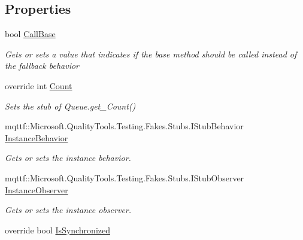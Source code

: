 \subsection*{Properties}
\begin{DoxyCompactItemize}
\item 
bool \hyperlink{class_system_1_1_collections_1_1_fakes_1_1_stub_queue_af8e85de8544d9c9900bdb8a3e651a3f9}{Call\-Base}
\begin{DoxyCompactList}\small\item\em Gets or sets a value that indicates if the base method should be called instead of the fallback behavior\end{DoxyCompactList}\item 
override int \hyperlink{class_system_1_1_collections_1_1_fakes_1_1_stub_queue_a956dfe53ab338c748c0e58170f743e9e}{Count}
\begin{DoxyCompactList}\small\item\em Sets the stub of Queue.\-get\-\_\-\-Count()\end{DoxyCompactList}\item 
mqttf\-::\-Microsoft.\-Quality\-Tools.\-Testing.\-Fakes.\-Stubs.\-I\-Stub\-Behavior \hyperlink{class_system_1_1_collections_1_1_fakes_1_1_stub_queue_abba63514c66cdd3d45f96174719b8e81}{Instance\-Behavior}
\begin{DoxyCompactList}\small\item\em Gets or sets the instance behavior.\end{DoxyCompactList}\item 
mqttf\-::\-Microsoft.\-Quality\-Tools.\-Testing.\-Fakes.\-Stubs.\-I\-Stub\-Observer \hyperlink{class_system_1_1_collections_1_1_fakes_1_1_stub_queue_a47397af678d8d1cd28b03b683ba7d22a}{Instance\-Observer}
\begin{DoxyCompactList}\small\item\em Gets or sets the instance observer.\end{DoxyCompactList}\item 
override bool \hyperlink{class_system_1_1_collections_1_1_fakes_1_1_stub_queue_a6497c2de0251eb0619e8fbaccbae3e6a}{Is\-Synchronized}

\end{DoxyCompactItemize}
